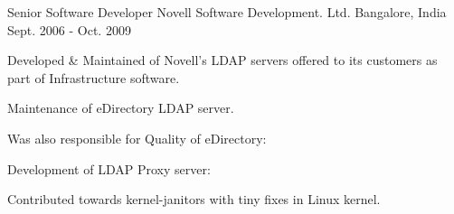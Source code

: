   \cventry
    {Senior Software Developer} %
    {Novell Software Development. Ltd.} %
    {Bangalore, India} %
    {Sept. 2006 - Oct. 2009} %
    {
      \begin{cvitems} %
      \item {Developed \& Maintained of Novell's LDAP servers offered to its customers as part of Infrastructure software.}
      \item {Maintenance of eDirectory LDAP server.}
      \item {Was also responsible for Quality of  eDirectory:}
      \item {Development of LDAP Proxy server:}
      \item {Contributed towards kernel-janitors with tiny fixes in Linux kernel.}
      \end{cvitems}
    }

